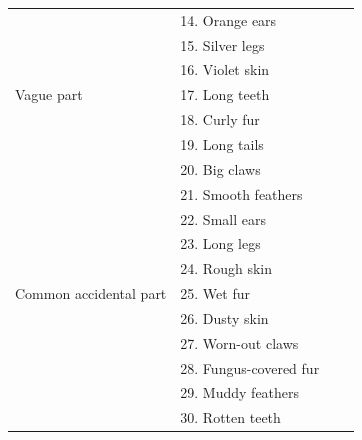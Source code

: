 \documentclass[10pt,letterpaper]{article}
\begin{document}
\begin{table}[h]
\begin{tabular}{| l || l | l | l |}
                                          & 14. Orange ears                    &                &                     \\
                                          & 15. Silver legs                       &                &                     \\
                                          & 16. Violet skin                      &                &                     \\       
Vague part      	 & 17. Long teeth       &                &                     \\
                                          & 18. Curly fur                       &                &                     \\
                                          & 19. Long tails                         &                &                     \\
                                          & 20. Big claws                       &                &                     \\
                                          & 21. Smooth feathers                      &                &                     \\
                                          & 22. Small ears                    &                &                     \\
                                          & 23. Long legs                       &                &                     \\
                                          & 24. Rough skin                      &                &                     \\ 
Common accidental part    & 25. Wet fur       &                &                     \\
                                          & 26. Dusty skin                       &                &                     \\
                                          & 27. Worn-out claws                         &                &                     \\
                                          & 28. Fungus-covered fur                      &                &                     \\
                                          & 29. Muddy feathers                      &                &                     \\
                                          & 30. Rotten teeth                   &                &                     \\

\end{tabular}
\end{table}
\end{document}
